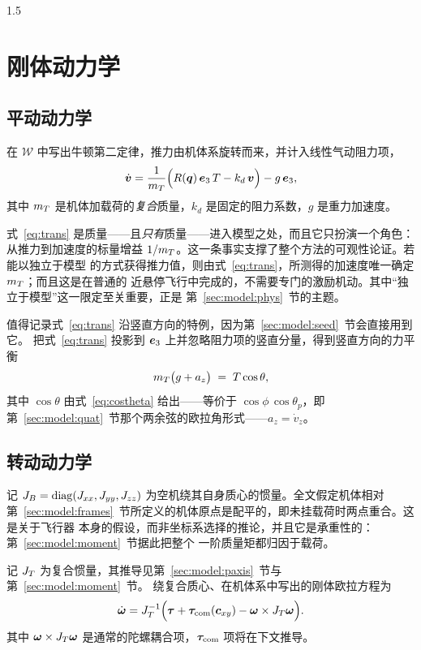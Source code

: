 \begin{spacing}{1.5}
\section{刚体动力学}\label{sec:model:dyn}

\subsection{平动动力学}\label{sec:model:trans}

在 $\mathcal{W}$ 中写出牛顿第二定律，推力由机体系旋转而来，并计入线性气动阻力项，
\begin{equation}
\dot{\bm{v}} = \frac{1}{m_T}\Bigl( R(\bm{q})\, \bm{e}_3\, T - k_d\, \bm{v} \Bigr) - g\, \bm{e}_3,
\label{eq:trans}
\end{equation}
其中 $m_T$ 是机体加载荷的\emph{复合}质量，$k_d$ 是固定的阻力系数，$g$ 是重力加速度。

式~\eqref{eq:trans} 是质量——且\emph{只有}质量——进入模型之处，而且它只扮演一个角色：
从推力到加速度的标量增益 $1/m_T$。这一条事实支撑了整个方法的可观性论证。若能以独立于模型
的方式获得推力值，则由式~\eqref{eq:trans}，所测得的加速度唯一确定 $m_T$；而且这是在普通的
近悬停飞行中完成的，不需要专门的激励机动。其中“独立于模型”这一限定至关重要，正是
第~\ref{sec:model:phys}~节的主题。

值得记录式~\eqref{eq:trans} 沿竖直方向的特例，因为第~\ref{sec:model:seed}~节会直接用到它。
把式~\eqref{eq:trans} 投影到 $\bm{e}_3$ 上并忽略阻力项的竖直分量，得到竖直方向的力平衡
\begin{equation}
m_T\bigl(g + a_z\bigr) \;=\; T\cos\theta ,
\label{eq:vbal}
\end{equation}
其中 $\cos\theta$ 由式~\eqref{eq:costheta} 给出——等价于 $\cos\phi\,\cos\theta_p$，即第~\ref{sec:model:quat}~节那个两余弦的欧拉角形式——$a_z=\dot v_z$。

\subsection{转动动力学}\label{sec:model:rot}

记 $J_B = \mathrm{diag}(J_{xx}, J_{yy}, J_{zz})$ 为空机绕其自身质心的惯量。全文假定机体相对
第~\ref{sec:model:frames}~节所定义的机体原点是配平的，即未挂载荷时两点重合。这是关于飞行器
本身的假设，而非坐标系选择的推论，并且它是承重性的：第~\ref{sec:model:moment}~节据此把整个
一阶质量矩都归因于载荷。

记 $J_T$ 为复合惯量，其推导见第~\ref{sec:model:paxis}~节与第~\ref{sec:model:moment}~节。
绕复合质心、在机体系中写出的刚体欧拉方程为
\begin{equation}
\dot{\bm{\omega}} = J_T^{-1}\Bigl( \bm{\tau} + \bm{\tau}_{\mathrm{com}}(\bm{c}_{xy}) - \bm{\omega} \times J_T \bm{\omega} \Bigr).
\label{eq:rot}
\end{equation}
其中 $\bm{\omega} \times J_T \bm{\omega}$ 是通常的陀螺耦合项，$\bm{\tau}_{\mathrm{com}}$ 项将在下文推导。


\end{spacing}
